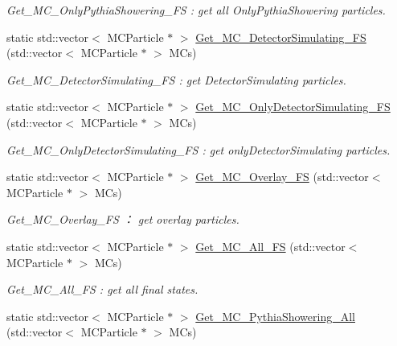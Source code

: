 \begin{DoxyCompactItemize}
\begin{DoxyCompactList}\small\item\em Get\_\-MC\_\-OnlyPythiaShowering\_\-FS : get all OnlyPythiaShowering particles. \item\end{DoxyCompactList}\item 
static std::vector$<$ MCParticle $\ast$ $>$ \hyperlink{classToolSet_1_1CMC_af0a81c6e40cc44cecfe9947be99783d4}{Get\_\-MC\_\-DetectorSimulating\_\-FS} (std::vector$<$ MCParticle $\ast$ $>$ MCs)
\begin{DoxyCompactList}\small\item\em Get\_\-MC\_\-DetectorSimulating\_\-FS : get DetectorSimulating particles. \item\end{DoxyCompactList}\item 
static std::vector$<$ MCParticle $\ast$ $>$ \hyperlink{classToolSet_1_1CMC_a766e7761a6db662243c7490a615c380e}{Get\_\-MC\_\-OnlyDetectorSimulating\_\-FS} (std::vector$<$ MCParticle $\ast$ $>$ MCs)
\begin{DoxyCompactList}\small\item\em Get\_\-MC\_\-OnlyDetectorSimulating\_\-FS : get onlyDetectorSimulating particles. \item\end{DoxyCompactList}\item 
static std::vector$<$ MCParticle $\ast$ $>$ \hyperlink{classToolSet_1_1CMC_a0174dfbf7511f9fa827d9fff33aabc8b}{Get\_\-MC\_\-Overlay\_\-FS} (std::vector$<$ MCParticle $\ast$ $>$ MCs)
\begin{DoxyCompactList}\small\item\em Get\_\-MC\_\-Overlay\_\-FS ： get overlay particles. \item\end{DoxyCompactList}\item 
static std::vector$<$ MCParticle $\ast$ $>$ \hyperlink{classToolSet_1_1CMC_a826b4fcc4ae58b18ceec544fb5abf563}{Get\_\-MC\_\-All\_\-FS} (std::vector$<$ MCParticle $\ast$ $>$ MCs)
\begin{DoxyCompactList}\small\item\em Get\_\-MC\_\-All\_\-FS : get all final states. \item\end{DoxyCompactList}\item 
static std::vector$<$ MCParticle $\ast$ $>$ \hyperlink{classToolSet_1_1CMC_a96c8f9998df8b19c84b0f45271195ef9}{Get\_\-MC\_\-PythiaShowering\_\-All} (std::vector$<$ MCParticle $\ast$ $>$ MCs)

\end{DoxyCompactItemize}
